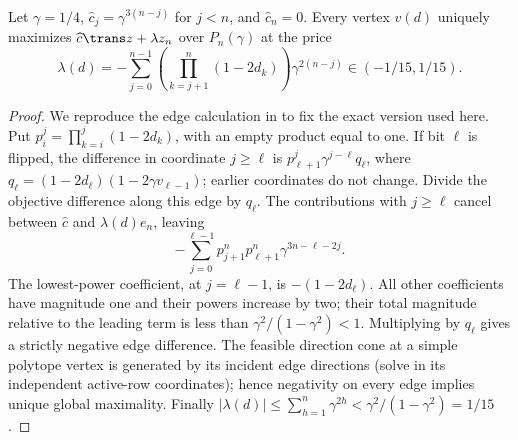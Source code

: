 \begin{lemma}\label{lem:klee-shadow}
Let \(\gamma=1/4\), \(\widehat c_j=\gamma^{3(n-j)}\) for \(j<n\), and
\(\widehat c_n=0\). Every vertex \(v(d)\) uniquely maximizes
\(\widehat c\trans z+\lambda z_n\) over \(P_n(\gamma)\) at the price
\[
 \lambda(d)=-\sum_{j=0}^{n-1}
       \left(\prod_{k=j+1}^n(1-2d_k)\right)\gamma^{2(n-j)}
       \in(-1/15,1/15).
\]
\end{lemma}
\begin{proof}
We reproduce the edge calculation in \citet[Definition~11 and Lemma~12]{GartnerEtAl2013}
to fix the exact version used here. Put
\(p_i^j=\prod_{k=i}^j(1-2d_k)\), with an empty product equal to one.
If bit \(\ell\) is flipped, the difference in coordinate \(j\ge\ell\) is
\(p_{\ell+1}^j\gamma^{j-\ell}q_\ell\), where
\(q_\ell=(1-2d_\ell)(1-2\gamma v_{\ell-1})\); earlier coordinates do not
change. Divide the objective difference along this edge by \(q_\ell\).
The contributions with \(j\ge\ell\) cancel between \(\widehat c\) and
\(\lambda(d)e_n\), leaving
\[
 -\sum_{j=0}^{\ell-1}p_{j+1}^n p_{\ell+1}^n
                  \gamma^{3n-\ell-2j}.
\]
The lowest-power coefficient, at \(j=\ell-1\), is \(-(1-2d_\ell)\).
All other coefficients have magnitude one and their powers increase by two;
their total magnitude relative to the leading term is less than
\(\gamma^2/(1-\gamma^2)<1\). Multiplying by \(q_\ell\) gives a strictly
negative edge difference. The feasible direction cone at a simple polytope
vertex is generated by its incident edge directions (solve in its independent
active-row coordinates); hence negativity on every edge implies unique global
maximality. Finally
\(|\lambda(d)|\le\sum_{h=1}^n\gamma^{2h}<\gamma^2/(1-\gamma^2)=1/15\).
\end{proof}

